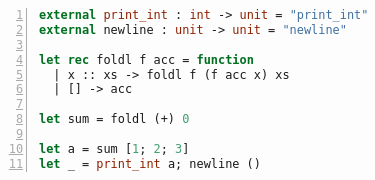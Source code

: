 \begin{lstlisting}[language=Caml, numbers=left, stepnumber=1]
external print_int : int -> unit = "print_int"
external newline : unit -> unit = "newline"

let rec foldl f acc = function
  | x :: xs -> foldl f (f acc x) xs
  | [] -> acc

let sum = foldl (+) 0

let a = sum [1; 2; 3]
let _ = print_int a; newline ()
\end{lstlisting}